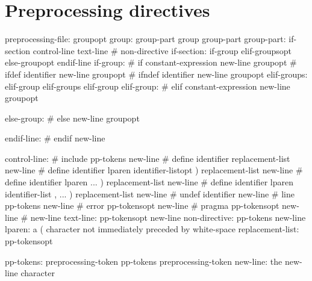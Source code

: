 \section{Preprocessing directives}
\begin{code_files}
preprocessing-file:
	groupopt
group:
	group-part
	group group-part
group-part:
	if-section
	control-line
	text-line
	# non-directive
if-section:
	if-group elif-groupsopt else-groupopt endif-line
if-group:
	# if
	constant-expression new-line groupopt
	# ifdef identifier new-line groupopt
	# ifndef identifier new-line groupopt
elif-groups:
	elif-group
	elif-groups elif-group
elif-group:
	# elif constant-expression new-line groupopt

else-group:
	# else new-line groupopt

endif-line:
	# endif new-line

control-line:
	# include pp-tokens new-line
	# define identifier replacement-list new-line
	# define identifier lparen identifier-listopt )
	replacement-list new-line
	# define identifier lparen ... ) replacement-list new-line
	# define identifier lparen identifier-list , ... )
	replacement-list new-line
	# undef identifier new-line
	# line pp-tokens new-line
	# error pp-tokensopt new-line
	# pragma pp-tokensopt new-line
	# new-line
text-line:
	pp-tokensopt new-line
non-directive:
	pp-tokens new-line
lparen:
	a ( character not immediately preceded by white-space
replacement-list:
	pp-tokensopt

pp-tokens:
	preprocessing-token
	pp-tokens preprocessing-token
new-line:
	the new-line character
\end{code_files}


